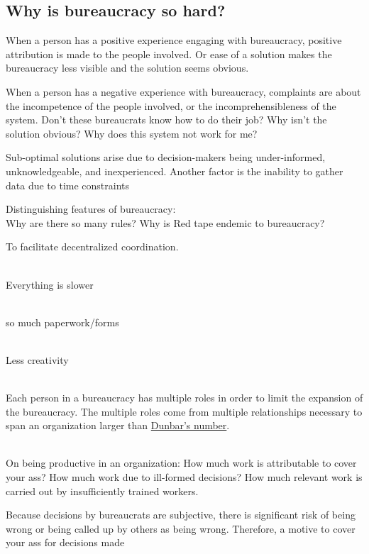 \subsection{Why is bureaucracy so hard?}

When a person has a positive experience engaging with bureaucracy, positive attribution is made to the people involved. Or ease of a solution makes the bureaucracy less visible and the solution seems obvious. 


When a person has a negative experience with bureaucracy, complaints are about the incompetence of the people involved, or the incomprehensibleness of the system. Don't these bureaucrats know how to do their job? Why isn't the solution obvious? Why does this system not work for me?


Sub-optimal solutions arise due to decision-makers being under-informed, unknowledgeable, and inexperienced. Another factor is the inability to gather data due to time constraints


Distinguishing features of bureaucracy:
\ \\

Why are there so many rules? Why is Red tape endemic to bureaucracy?

To facilitate decentralized coordination. 

\ \\

Everything is slower

\ \\

so much paperwork/forms

\ \\

Less creativity

\ \\

Each person in a bureaucracy has multiple roles in order to limit the expansion of the bureaucracy. The multiple roles come from multiple relationships necessary to span an organization larger than \href{https://en.wikipedia.org/wiki/Dunbar\%27s_number}{Dunbar's number}. 

\ \\

On being productive in an organization:
How much work is attributable to cover your ass? How much work due to ill-formed decisions? How much relevant work is carried out by insufficiently trained workers. 

Because decisions by bureaucrats are subjective, there is significant risk of being wrong or being called up by others as being wrong. Therefore, a motive to cover your ass for decisions made

